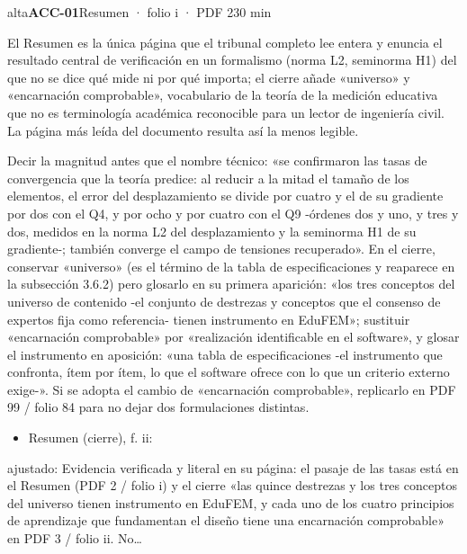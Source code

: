 \begin{ficha}{alta}{\casilla\textbf{ACC-01}\quad{}\quad Resumen · folio i · PDF 2\hfill 30 min}
\par
{}El Resumen es la única página que el tribunal completo lee entera y enuncia el resultado central de verificación en un formalismo (norma L2, seminorma H1) del que no se dice qué mide ni por qué importa; el cierre añade «universo» y «encarnación comprobable», vocabulario de la teoría de la medición educativa que no es terminología académica reconocible para un lector de ingeniería civil. La página más leída del documento resulta así la menos legible.\par
{}Decir la magnitud antes que el nombre técnico: «se confirmaron las tasas de convergencia que la teoría predice: al reducir a la mitad el tamaño de los elementos, el error del desplazamiento se divide por cuatro y el de su gradiente por dos con el Q4, y por ocho y por cuatro con el Q9 -órdenes dos y uno, y tres y dos, medidos en la norma L2 del desplazamiento y la seminorma H1 de su gradiente-; también converge el campo de tensiones recuperado». En el cierre, conservar «universo» (es el término de la tabla de especificaciones y reaparece en la subsección 3.6.2) pero glosarlo en su primera aparición: «los tres conceptos del universo de contenido -el conjunto de destrezas y conceptos que el consenso de expertos fija como referencia- tienen instrumento en EduFEM»; sustituir «encarnación comprobable» por «realización identificable en el software», y glosar el instrumento en aposición: «una tabla de especificaciones -el instrumento que confronta, ítem por ítem, lo que el software ofrece con lo que un criterio externo exige-». Si se adopta el cambio de «encarnación comprobable», replicarlo en PDF 99 /\allowbreak{} folio 84 para no dejar dos formulaciones distintas.\par
{}\begin{itemize}[leftmargin=1.2em,itemsep=1pt,topsep=1pt]
\item {\small Resumen (cierre), f. ii: }
\end{itemize}
{\footnotesize\color{gris}ajustado: Evidencia verificada y literal en su página: el pasaje de las tasas está en el Resumen (PDF 2 /\allowbreak{} folio i) y el cierre «las quince destrezas y los tres conceptos del universo tienen instrumento en EduFEM, y cada uno de los cuatro principios de aprendizaje que fundamentan el diseño tiene una encarnación comprobable» en PDF 3 /\allowbreak{} folio ii. No…\par}
\end{ficha}
